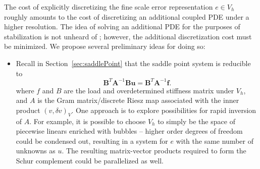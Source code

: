 \documentclass[final,leqno]{siamltex}
\newcommand{\bs}[1]{\boldsymbol{#1}}
\newcommand{\LRp}[1]{\left( #1 \right)}
\begin{document}
The cost of explicitly discretizing the fine scale error representation $e\in V_h$ roughly amounts to the cost of discretizing an additional coupled PDE under a higher resolution.   The idea of solving an additional PDE for the purposes of stabilization is not unheard of \cite{Barter}; however, the additional discretization cost must be minimized.  We propose several preliminary ideas for doing so: 
\begin{itemize}
\item Recall in Section~\ref{sec:saddlePoint} that the saddle point system is reducible to 
\[
\bs{B}^T \bs{A}^{-1}\bs{B} \bs{u} = \bs{B}^T \bs{A}^{-1}\bs{f}.
\]
where $f$ and $B$ are the load and overdetermined stiffness matrix under $V_h$, and $A$ is the Gram matrix/discrete Riesz map associated with the inner product $\LRp{v,\delta v}_V$.  One approach is to explore possibilities for rapid inversion of $A$.  For example, it is possible to choose $V_h$ to simply be the space of piecewise linears enriched with bubbles -- higher order degrees of freedom could be condensed out, resulting in a system for $e$ with the same number of unknowns as $u$.  The resulting matrix-vector products required to form the Schur complement could be parallelized as well.  


\end{itemize}
\end{document}
